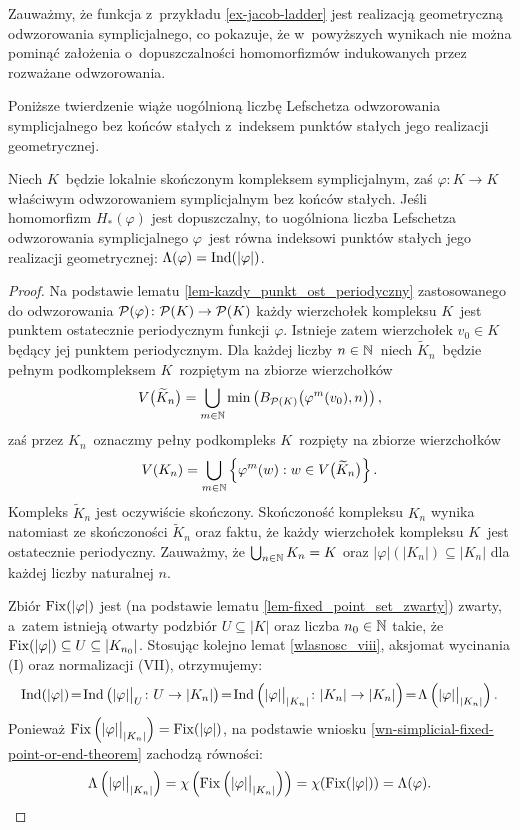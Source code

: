 Zauważmy, że funkcja z~przykładu \ref{ex-jacob-ladder} jest realizacją geometryczną odwzorowania symplicjalnego, co pokazuje, że w~powyższych wynikach nie można pominąć założenia o~dopuszczalności homomorfizmów indukowanych przez rozważane odwzorowania.

Poniższe twierdzenie wiąże uogólnioną liczbę Lefschetza odwzorowania symplicjalnego bez końców stałych z~indeksem punktów stałych jego realizacji geometrycznej.

\begin{tw}\label{tw-rownosc_indeksu_i_l_lefschetza_odwz_sympl}
Niech $K$~będzie lokalnie skończonym kompleksem symplicjalnym, zaś $\varphi\colon K\to K$ właściwym odwzorowaniem symplicjalnym bez końców stałych. Jeśli homomorfizm $H_*(\varphi)$ jest dopuszczalny, to uogólniona liczba Lefschetza odwzorowania symplicjalnego $\varphi$~jest równa indeksowi punktów stałych jego realizacji geometrycznej: $\Lambda(\varphi)=\operatorname{Ind}(|\varphi|)$.
\end{tw}
\begin{proof}
Na podstawie lematu \ref{lem-kazdy_punkt_ost_periodyczny} zastosowanego do odwzorowania $\mathcal{P}(\varphi)\colon\mathcal{P}(K)\to\mathcal{P}(K)$ każdy wierzchołek kompleksu $K$~jest punktem ostatecznie periodycznym funkcji $\varphi$. Istnieje zatem wierzchołek $v_0\in K$ będący jej punktem periodycznym. Dla każdej liczby $n\in\mathbb{N}$~niech $\widetilde{K}_n$~będzie pełnym podkompleksem $K$~rozpiętym na zbiorze wierzchołków \[V\bigl(\widetilde{K}_n\bigr)=\bigcup_{m\in\mathbb{N}} \min\left(B_{\mathcal{P}(K)}\bigl(\varphi^m(v_0),n\bigr)\right),\] zaś przez $K_n$~oznaczmy pełny podkompleks $K$~rozpięty na zbiorze wierzchołków \[V(K_n)=\bigcup_{m\in\mathbb{N}}\left\{\varphi^m(w):w\in V\bigl(\widetilde{K}_n\bigr)\right\}.\] Kompleks $\widetilde{K}_n$ jest oczywiście skończony. Skończoność kompleksu $K_n$ wynika natomiast ze skończoności $\widetilde{K}_n$ oraz faktu, że każdy wierzchołek kompleksu $K$~jest ostatecznie periodyczny. Zauważmy, że $\bigcup_{n\in\mathbb{N}}K_n=K$ oraz $|\varphi|(|K_n|)\subseteq |K_n|$ dla każdej liczby naturalnej $n$.

Zbiór $\operatorname{Fix}(|\varphi|)$ jest (na podstawie lematu \ref{lem-fixed_point_set_zwarty}) zwarty, a~zatem istnieją otwarty podzbiór $U\subseteq |K|$ oraz liczba $n_0\in\mathbb{N}$ takie, że $\operatorname{Fix}(|\varphi|)\subseteq U\subseteq \left|K_{n_0}\right|$. Stosując kolejno lemat \ref{wlasnosc_viii}, aksjomat wycinania (I) oraz normalizacji (VII), otrzymujemy:
\[\operatorname{Ind}(|\varphi|)\!=\!\operatorname{Ind}\left(|\varphi|\big|_{U}\colon U\to |K_n|\right)\!=\!\operatorname{Ind}\left(|\varphi|\big|_{|K_n|}\colon |K_n|\to |K_n|\right)\!=\!\Lambda\left(|\varphi|\big|_{|K_n|}\right).\]
Ponieważ $\operatorname{Fix}\left(|\varphi|\big|_{|K_n|}\right)=\operatorname{Fix}(|\varphi|)$, na podstawie wniosku \ref{wn-simplicial-fixed-point-or-end-theorem} zachodzą równości:
\[\Lambda\left(|\varphi|\big|_{|K_n|}\right)=\chi\left(\operatorname{Fix}\left(|\varphi|\big|_{|K_n|}\right)\right)=\chi(\operatorname{Fix}(|\varphi|))=\Lambda(\varphi).\qedhere\]
\end{proof}



